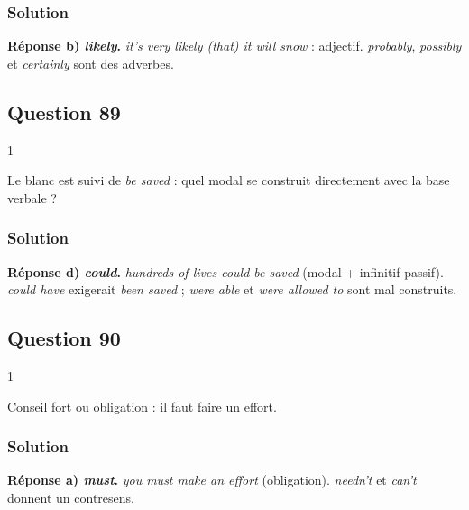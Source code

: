 \documentclass[11pt,a4paper]{article}
\begin{document}
\hypertarget{solution-87}{%
\subsubsection{Solution}\label{solution-87}}

\textbf{Réponse b) \emph{likely}.} \emph{it's very likely (that) it will snow} : adjectif. \emph{probably}, \emph{possibly} et \emph{certainly} sont des adverbes.

\hypertarget{question-89}{%
\subsection{Question 89}\label{question-89}}

\begin{indication}{1}

Le blanc est suivi de \emph{be saved} : quel modal se construit directement avec la base verbale ?

\end{indication}

\hypertarget{solution-88}{%
\subsubsection{Solution}\label{solution-88}}

\textbf{Réponse d) \emph{could}.} \emph{hundreds of lives could be saved} (modal + infinitif passif). \emph{could have} exigerait \emph{been saved} ; \emph{were able} et \emph{were allowed to} sont mal construits.

\hypertarget{question-90}{%
\subsection{Question 90}\label{question-90}}

\begin{indication}{1}

Conseil fort ou obligation : il faut faire un effort.

\end{indication}

\hypertarget{solution-89}{%
\subsubsection{Solution}\label{solution-89}}

\textbf{Réponse a) \emph{must}.} \emph{you must make an effort} (obligation). \emph{needn't} et \emph{can't} donnent un contresens.
\end{document}

